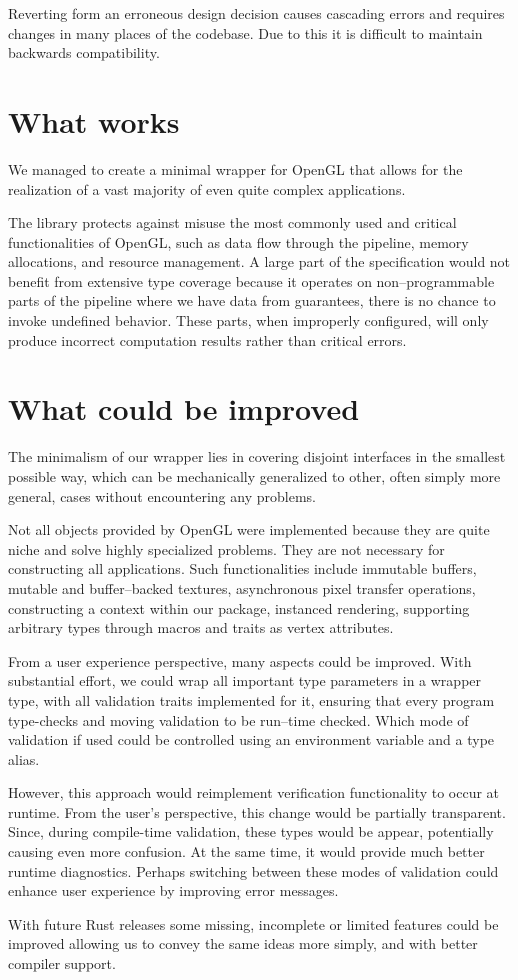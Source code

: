 Reverting form an erroneous design decision causes cascading errors and requires changes in many places of the codebase. Due to this it is difficult to maintain backwards compatibility.

\section{What works}

We managed to create a minimal wrapper for OpenGL that allows for the realization of a vast majority of even quite complex applications.

The library protects against misuse the most commonly used and critical functionalities of OpenGL, such as data flow through the pipeline, memory allocations, and resource management. 
A large part of the specification would not benefit from extensive type coverage because it operates on non--programmable parts of the pipeline where we have data from guarantees, 
there is no chance to invoke undefined behavior. These parts, when improperly configured, will only produce incorrect computation results rather than critical errors. 

\section{What could be improved}

The minimalism of our wrapper lies in covering disjoint interfaces in the smallest possible way, which can be mechanically generalized to other, often simply more general, cases without encountering any problems.

Not all objects provided by OpenGL were implemented because they are quite niche and solve highly specialized problems. 
They are not necessary for constructing all applications. 
Such functionalities include immutable buffers, mutable and buffer--backed textures, asynchronous pixel transfer operations, constructing a context within our package, instanced rendering, supporting arbitrary types through macros and traits as vertex attributes.

From a user experience perspective, many aspects could be improved.
With substantial effort, we could wrap all important type parameters in a wrapper type, with all validation traits implemented for it, ensuring that every program type-checks
and moving validation to be run--time checked. Which mode of validation if used could be controlled using an environment variable and a type alias.

However, this approach would reimplement verification functionality to occur at runtime. 
From the user's perspective, this change would be partially transparent. 
Since, during compile-time validation, these types would be appear, potentially causing even more confusion. 
At the same time, it would provide much better runtime diagnostics. 
Perhaps switching between these modes of validation could enhance user experience by improving error messages.

With future Rust releases some missing, incomplete or limited features could be improved allowing us to convey the same ideas more simply,
and with better compiler support.
